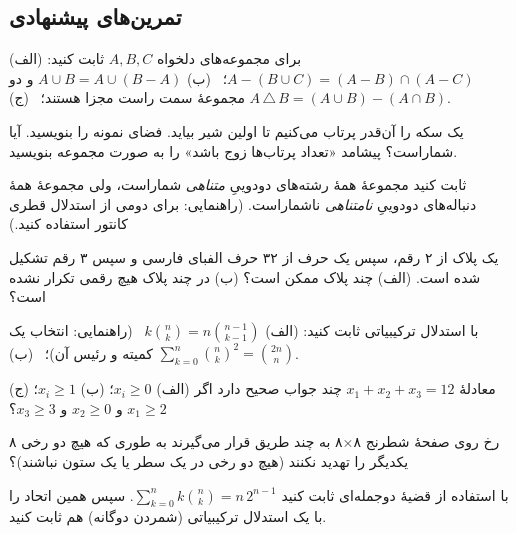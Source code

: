 \subsection*{تمرین‌های پیشنهادی}

\begin{exercise}
برای مجموعه‌های دلخواه $A,B,C$ ثابت کنید:
(الف) $A-(B\cup C)=(A-B)\cap(A-C)$؛ \
(ب) $A\cup B=A\cup(B-A)$ و دو مجموعهٔ سمت راست مجزا هستند؛ \
(ج) $A\,\triangle\,B=(A\cup B)-(A\cap B)$.
\end{exercise}

\begin{exercise}
یک سکه را آن‌قدر پرتاب می‌کنیم تا اولین شیر بیاید. فضای نمونه را بنویسید. آیا شماراست؟ پیشامد «تعداد پرتاب‌ها زوج باشد» را به صورت مجموعه بنویسید.
\end{exercise}

\begin{exercise}
ثابت کنید مجموعهٔ همهٔ رشته‌های دودوییِ \emph{متناهی} شماراست، ولی مجموعهٔ همهٔ دنباله‌های دودوییِ \emph{نامتناهی} ناشماراست. (راهنمایی: برای دومی از استدلال قطری کانتور استفاده کنید.)
\end{exercise}

\begin{exercise}
یک پلاک از ۲ رقم، سپس یک حرف از ۳۲ حرف الفبای فارسی و سپس ۳ رقم تشکیل شده است. (الف) چند پلاک ممکن است؟ (ب) در چند پلاک هیچ رقمی تکرار نشده است؟
\end{exercise}

\begin{exercise}
با استدلال ترکیبیاتی ثابت کنید: (الف) $\displaystyle k\binom nk=n\binom{n-1}{k-1}$ \ (راهنمایی: انتخاب یک کمیته و رئیس آن)؛ \ (ب) $\displaystyle\sum_{k=0}^n\binom nk^2=\binom{2n}{n}$.
\end{exercise}

\begin{exercise}
معادلهٔ $x_1+x_2+x_3=12$ چند جواب صحیح دارد اگر (الف) $x_i\ge0$؛ (ب) $x_i\ge1$؛ (ج) $x_1\ge2$ و $x_2\ge0$ و $x_3\ge3$؟
\end{exercise}

\begin{exercise}[\lr{Ross}]
۸ رخ روی صفحهٔ شطرنج ۸×۸ به چند طریق قرار می‌گیرند به طوری که هیچ دو رخی یکدیگر را تهدید نکنند (هیچ دو رخی در یک سطر یا یک ستون نباشند)؟
\answer{$8!=40{,}320$}
\end{exercise}

\begin{exercise}\hard
با استفاده از قضیهٔ دوجمله‌ای ثابت کنید $\displaystyle\sum_{k=0}^n k\binom nk=n\,2^{n-1}$. سپس همین اتحاد را با یک استدلال ترکیبیاتی (شمردن دوگانه) هم ثابت کنید.
\end{exercise}
